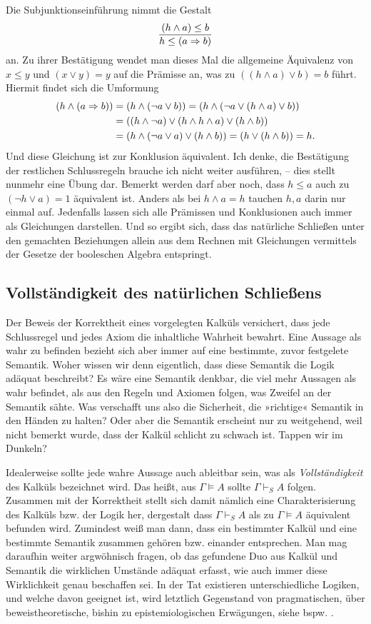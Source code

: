 Die Subjunktionseinführung nimmt die Gestalt
\[\dfrac{(h\land a)\le b}{h\le (a\Rightarrow b)}\]
an. Zu ihrer Bestätigung wendet man dieses Mal die allgemeine Äquivalenz
von $x\le y$ und $(x\lor y) = y$ auf die Prämisse an, was zu
$((h\land a)\lor b) = b$ führt. Hiermit findet sich die
Umformung%
\begin{align*}
(h\land (a\Rightarrow b)) &= (h\land (\lnot a\lor b))
= (h\land (\lnot a\lor (h\land a)\lor b))\\
&= ((h\land\lnot a)\lor (h\land h\land a)\lor (h\land b))\\
&= (h\land (\lnot a\lor a)\lor (h\land b))
= (h\lor (h\land b)) = h.
\end{align*}
Und diese Gleichung ist zur Konklusion äquivalent. Ich denke, die Bestätigung
der restlichen Schlussregeln brauche ich nicht weiter ausführen, -- dies
stellt nunmehr eine Übung dar. Bemerkt werden darf aber noch, dass $h\le a$
auch zu $(\lnot h\lor a)=1$ äquivalent ist. Anders als bei $h\land a=h$
tauchen $h,a$ darin nur einmal auf. Jedenfalls lassen sich alle Prämissen
und Konklusionen auch immer als Gleichungen darstellen. Und so ergibt sich,
dass das natürliche Schließen unter den gemachten Beziehungen allein aus
dem Rechnen mit Gleichungen vermittels der Gesetze der booleschen
Algebra entspringt.

\newpage
\subsection{Vollständigkeit des natürlichen Schließens}

Der Beweis der Korrektheit eines vorgelegten Kalküls versichert,
dass jede Schlussregel und jedes Axiom die inhaltliche Wahrheit
bewahrt. Eine Aussage als wahr zu befinden bezieht sich aber immer
auf eine bestimmte, zuvor festgelete Semantik. Woher wissen wir denn
eigentlich, dass diese Semantik die Logik adäquat beschreibt? Es wäre
eine Semantik denkbar, die viel mehr Aussagen als wahr befindet, als
aus den Regeln und Axiomen folgen, was Zweifel an der Semantik sähte.
Was verschafft uns also die Sicherheit, die »richtige« Semantik in den
Händen zu halten? Oder aber die Semantik erscheint nur zu weitgehend,
weil nicht bemerkt wurde, dass der Kalkül schlicht zu schwach ist.
Tappen wir im Dunkeln?

Idealerweise sollte jede wahre Aussage auch ableitbar sein, was als
\emph{Vollständigkeit} des Kalküls bezeichnet wird. Das heißt, aus
$\Gamma\models A$ sollte $\Gamma\vdash_S A$ folgen. Zusammen mit der
Korrektheit stellt sich damit nämlich eine Charakterisierung des
Kalküls bzw. der Logik her, dergestalt dass $\Gamma\vdash_S A$ als zu
$\Gamma\models A$ äquivalent befunden wird. Zumindest weiß man dann,
dass ein bestimmter Kalkül und eine bestimmte Semantik zusammen gehören
bzw. einander entsprechen. Man mag daraufhin weiter argwöhnisch fragen,
ob das gefundene Duo aus Kalkül und Semantik die wirklichen Umstände
adäquat erfasst, wie auch immer diese Wirklichkeit genau beschaffen
sei. In der Tat existieren unterschiedliche Logiken, und welche davon
geeignet ist, wird letztlich Gegenstand von pragmatischen, über
beweistheoretische, bishin zu epistemiologischen Erwägungen, siehe bspw.
\cite{George}.

